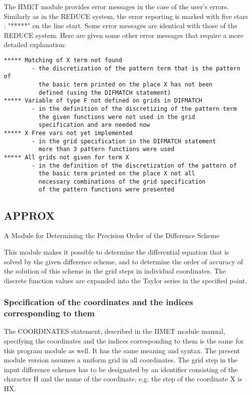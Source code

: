      The IIMET  module provides error messages in the case of the user's
errors. Similarly as in the REDUCE system, the error reporting is marked
with five  stars :  "*****" on  the line  start. Some error messages are
identical with those of  the REDUCE  system. Here  are given  some other
error messages that require a more detailed explanation:
\begin{verbatim}
***** Matching of X term not found
        - the discretization of the pattern term that is the pattern of
          the basic term printed on the place X has not been
          defined (using the DIFMATCH statement)
***** Variable of type F not defined on grids in DIFMATCH
        - in the definition of the discretizing of the pattern term
          the given functions were not used in the grid
          specification and are needed now
***** X Free vars not yet implemented
        - in the grid specification in the DIFMATCH statement
          more than 3 pattern functions were used
***** All grids not given for term X
        - in the definition of the discretization of the pattern of
          the basic term printed on the place X not all
          necessary combinations of the grid specification
          of the pattern functions were presented
\end{verbatim}


\subsection{APPROX}



             A Module for Determining the Precision Order
                       of the Difference Scheme



     This  module  makes  it  possible  to  determine  the  differential
equation that is solved by the given difference scheme, and to determine
the order  of accuracy  of the solution of this scheme in the grid steps
in individual coordinates. The  discrete  function  values  are expanded
into the Taylor series in the specified point.


\subsubsection{Specification of the coordinates and the indices
    corresponding to them}


     The COORDINATES  statement, described  in the  IIMET module manual,
specifying the coordinates and the indices corresponding to  them is the
same  for  this  program  module  as  well.  It has the same meaning and
syntax. The  present  module  version  assumes  a  uniform  grid  in all
coordinates. The  grid step  in the  input difference  schemes has to be
designated by an identifier consisting of the character  H and  the name
of the coordinate, e.g. the step of the coordinate X is HX.


